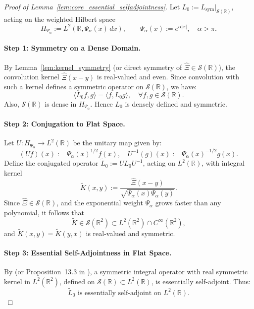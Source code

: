 \begin{proof}[Proof of Lemma~\ref{lem:core_essential_selfadjointness}]
Let \( L_0 := L_{\mathrm{sym}}|_{\mathcal{S}(\mathbb{R})} \), acting on the weighted Hilbert space
\[
H_{\Psi_\alpha} := L^2(\mathbb{R}, \Psi_\alpha(x)\, dx), \qquad \Psi_\alpha(x) := e^{\alpha |x|}, \quad \alpha > \pi.
\]

\paragraph{Step 1: Symmetry on a Dense Domain.}
By Lemma~\ref{lem:kernel_symmetry} (or direct symmetry of \( \widehat{\Xi} \in \mathcal{S}(\mathbb{R}) \)), the convolution kernel \( \widehat{\Xi}(x - y) \) is real-valued and even. Since convolution with such a kernel defines a symmetric operator on \( \mathcal{S}(\mathbb{R}) \), we have:
\[
\langle L_0 f, g \rangle = \langle f, L_0 g \rangle, \quad \forall f, g \in \mathcal{S}(\mathbb{R}).
\]
Also, \( \mathcal{S}(\mathbb{R}) \) is dense in \( H_{\Psi_\alpha} \). Hence \( L_0 \) is densely defined and symmetric.

\paragraph{Step 2: Conjugation to Flat Space.}
Let \( U \colon H_{\Psi_\alpha} \to L^2(\mathbb{R}) \) be the unitary map given by:
\[
(Uf)(x) := \Psi_\alpha(x)^{1/2} f(x), \quad U^{-1}(g)(x) := \Psi_\alpha(x)^{-1/2} g(x).
\]
Define the conjugated operator \( \widetilde{L}_0 := U L_0 U^{-1} \), acting on \( L^2(\mathbb{R}) \), with integral kernel
\[
\widetilde{K}(x, y) := \frac{\widehat{\Xi}(x - y)}{\sqrt{\Psi_\alpha(x)\Psi_\alpha(y)}}.
\]
Since \( \widehat{\Xi} \in \mathcal{S}(\mathbb{R}) \), and the exponential weight \( \Psi_\alpha \) grows faster than any polynomial, it follows that
\[
\widetilde{K} \in \mathcal{S}(\mathbb{R}^2) \subset L^2(\mathbb{R}^2) \cap C^\infty(\mathbb{R}^2),
\]
and \( \widetilde{K}(x,y) = \widetilde{K}(y,x) \) is real-valued and symmetric.

\paragraph{Step 3: Essential Self-Adjointness in Flat Space.}
By \cite[Thm.~X.36]{ReedSimon1975II} (or Proposition~13.3 in \cite{ReedSimon1980I}), a symmetric integral operator with real symmetric kernel in \( L^2(\mathbb{R}^2) \), defined on \( \mathcal{S}(\mathbb{R}) \subset L^2(\mathbb{R}) \), is essentially self-adjoint. Thus:
\[
\widetilde{L}_0 \text{ is essentially self-adjoint on } L^2(\mathbb{R}).
\]


\end{proof}
